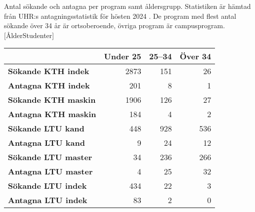 \documentclass[a4paper,oneside,article,swedish]{memoir}
\begin{document}
\begin{table}
  \begin{sidecaption}{%
    Antal sökande och antagna per program samt åldersgrupp.
    Statistiken är hämtad från UHR:s antagningsstatistik för hösten 2024 
    \parencite{UHRstat}.
    De program med flest antal sökande över 34 år är ortsoberoende, övriga 
    program är campusprogram.
  }[ÅlderStudenter]
  \flushright
  \begin{tabular}{lrrr}
    \toprule
    & \textbf{Under 25} & \textbf{25--34} & \textbf{Över 34} \\
    \midrule
    \textbf{Sökande KTH indek} & 2873 & 151 & 26 \\
    \textbf{Antagna KTH indek} & 201 & 8 & 1 \\
    \midrule
    \textbf{Sökande KTH maskin} & 1906 & 126 & 27 \\
    \textbf{Antagna KTH maskin} & 184 & 4 & 2 \\
    \midrule
    \textbf{Sökande LTU kand} & 448 & 928 & 536 \\
    \textbf{Antagna LTU kand} & 9 & 24 & 12 \\
    \midrule
    \textbf{Sökande LTU master} & 34 & 236 & 266 \\
    \textbf{Antagna LTU master} & 4 & 25 & 32 \\
    \midrule
    \textbf{Sökande LTU indek} & 434 & 22 & 3 \\
    \textbf{Antagna LTU indek} & 83 & 2 & 0 \\
    \bottomrule
  \end{tabular}
  \end{sidecaption}
\end{table}
\end{document}
